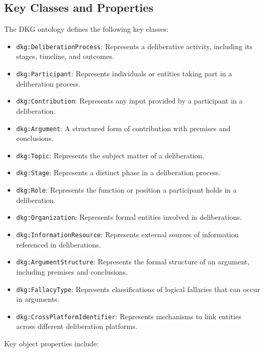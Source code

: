 \documentclass[runningheads]{llncs}  %
\begin{document}
\subsection{Key Classes and Properties}


The DKG ontology defines the following key classes:
\begin{itemize}
    \item \texttt{dkg:DeliberationProcess}: Represents a deliberative activity, including its stages, timeline, and outcomes.
    \item \texttt{dkg:Participant}: Represents individuals or entities taking part in a deliberation process.
    \item \texttt{dkg:Contribution}: Represents any input provided by a participant in a deliberation.
    \item \texttt{dkg:Argument}: A structured form of contribution with premises and conclusions.
    \item \texttt{dkg:Topic}: Represents the subject matter of a deliberation.
    \item \texttt{dkg:Stage}: Represents a distinct phase in a deliberation process.
    \item \texttt{dkg:Role}: Represents the function or position a participant holds in a deliberation.
    \item \texttt{dkg:Organization}: Represents formal entities involved in deliberations.
    \item \texttt{dkg:InformationResource}: Represents external sources of information referenced in deliberations.
    \item \texttt{dkg:ArgumentStructure}: Represents the formal structure of an argument, including premises and conclusions.
    \item \texttt{dkg:FallacyType}: Represents classifications of logical fallacies that can occur in arguments.
    \item \texttt{dkg:CrossPlatformIdentifier}: Represents mechanisms to link entities across different deliberation platforms.
\end{itemize}

Key object properties include:
\end{document}
